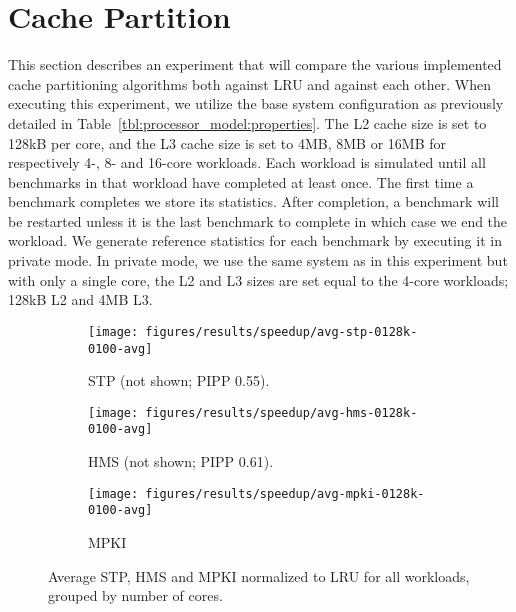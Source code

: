 
\section{Cache Partition}
\label{sec:results:cache_partition}

This section describes an experiment that will compare the various implemented cache partitioning algorithms both against LRU and against each other.
When executing this experiment, we utilize the base system configuration as previously detailed in Table~\ref{tbl:processor_model:properties}.
The L2 cache size is set to 128kB per core, and the L3 cache size is set to 4MB, 8MB or 16MB for respectively 4-, 8- and 16-core workloads.
Each workload is simulated until all benchmarks in that workload have completed at least once. 
The first time a benchmark completes we store its statistics.
After completion, a benchmark will be restarted unless it is the last benchmark to complete in which case we end the workload.
We generate reference statistics for each benchmark by executing it in private mode.
In private mode, we use the same system as in this experiment but with only a single core, the L2 and L3 sizes are set equal to the 4-core workloads; 128kB L2 and 4MB L3.

\begin{figure}[th]
    \centering
    \begin{subfigure}[b]{0.5\textwidth}
        \texttt{[image: figures/results/speedup/avg-stp-0128k-0100-avg]}
        \caption{STP (not shown; PIPP 0.55).}
        \label{fig:results:base:avg:stp}
    \end{subfigure}%
    \begin{subfigure}[b]{0.5\textwidth}
        \texttt{[image: figures/results/speedup/avg-hms-0128k-0100-avg]}
        \caption{HMS (not shown; PIPP 0.61).}
        \label{fig:results:base:avg:hms}
    \end{subfigure}
    \begin{subfigure}[b]{0.5\textwidth}
        \texttt{[image: figures/results/speedup/avg-mpki-0128k-0100-avg]}
        \caption{MPKI}
        \label{fig:results:base:avg:mpki}
    \end{subfigure}
    \caption[Average result grouped by core]{Average STP, HMS and MPKI normalized to LRU for all workloads, grouped by number of cores.}
    \label{fig:results:base:avg}
\end{figure}



